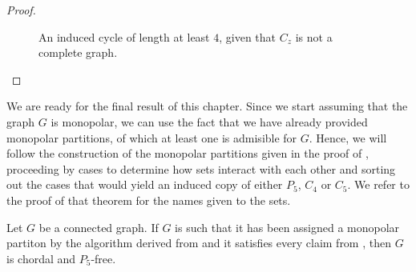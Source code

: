 \begin{proof}
\begin{enumerate}[label=(\roman*)]
            \begin{figure}[htb!]
                \centering
                \caption{An induced cycle of length at least $4$, given that
                    $C_z$ is not a complete graph.}
                \label{fig:additional_5}
            \end{figure}
    \end{enumerate}
\end{proof}

We are ready for the final result of this chapter. Since we start assuming that
the graph $G$ is monopolar, we can use the fact that we have already provided
monopolar partitions, of which at least one is admisible for $G$. Hence, we will
follow the construction of the monopolar partitions given in the proof of
, proceeding by cases to determine how sets interact
with each other and sorting out the cases that would yield an induced copy of
either $P_5$, $C_4$ or $C_5$. We refer to the proof of that theorem for the
names given to the sets.

\begin{theorem}
    Let $G$ be a connected graph. If $G$ is such that it has been assigned a
    monopolar partiton by the algorithm derived from
     and it satisfies every claim from
    , then $G$ is chordal and $P_5$-free.
\end{theorem}

